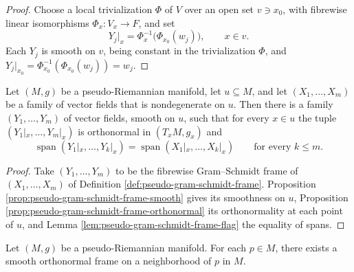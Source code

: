 \begin{proof}
\leanok
Choose a local trivialization $\Phi$ of $V$ over an open set $v \ni x_0$, with fibrewise linear isomorphisms $\Phi_x : V_x \to F$, and set
\[
Y_j|_x = \Phi_x^{-1}\bigl(\Phi_{x_0}(w_j)\bigr), \qquad x \in v .
\]
Each $Y_j$ is smooth on $v$, being constant in the trivialization $\Phi$, and $Y_j|_{x_0} = \Phi_{x_0}^{-1}(\Phi_{x_0}(w_j)) = w_j$.
\end{proof}

\begin{proposition}
\label{prop:orthonormalize-nondegenerate-family}
\leanok
{}
Let $(M,g)$ be a pseudo-Riemannian manifold, let $u \subseteq M$, and let $(X_1,\ldots,X_m)$ be a family of vector fields that is nondegenerate on $u$. Then there is a family $(Y_1,\ldots,Y_m)$ of vector fields, smooth on $u$, such that for every $x \in u$ the tuple $(Y_1|_x,\ldots,Y_m|_x)$ is orthonormal in $(T_xM,g_x)$ and
\[
\operatorname{span}(Y_1|_x,\ldots,Y_k|_x) = \operatorname{span}(X_1|_x,\ldots,X_k|_x) \qquad \text{for every } k \leq m .
\]
\end{proposition}

\begin{proof}
\leanok
{}
Take $(Y_1,\ldots,Y_m)$ to be the fibrewise Gram--Schmidt frame of $(X_1,\ldots,X_m)$ of Definition \ref{def:pseudo-gram-schmidt-frame}. Proposition \ref{prop:pseudo-gram-schmidt-frame-smooth} gives its smoothness on $u$, Proposition \ref{prop:pseudo-gram-schmidt-frame-orthonormal} its orthonormality at each point of $u$, and Lemma \ref{lem:pseudo-gram-schmidt-frame-flag} the equality of spans.
\end{proof}

\begin{proposition}
\label{prop:orthonormal-frames-pseudo-riemannian}
\leanok
{}
Let $(M,g)$ be a pseudo-Riemannian manifold. For each $p \in M$, there exists a smooth orthonormal frame on a neighborhood of $p$ in $M$.
\end{proposition}

